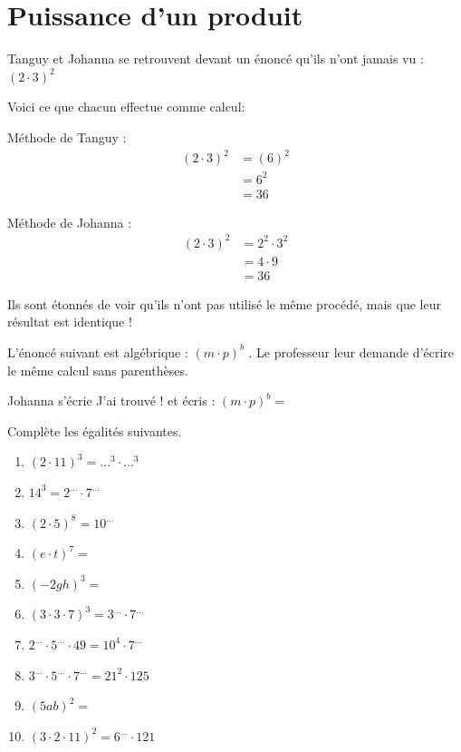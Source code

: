 \documentclass[../math2.tex]{subfiles}
\begin{document}
\section{Puissance d'un produit}
Tanguy et Johanna se retrouvent devant un énoncé qu'ils n'ont jamais vu : $(2\cdot3)^2$

Voici ce que chacun effectue comme calcul:

\parbox{.5\linewidth}{%
	\centering
	Méthode de Tanguy :
	\begin{align*}
		(2\cdot 3)^2
		 & = (6)^2 \\
		 & = 6^2   \\
		 & = 36
	\end{align*}}
\parbox{.5\linewidth}{%
	\centering
	Méthode de Johanna :
	\begin{align*}
		(2\cdot 3)^2
		 & = 2^2\cdot3^2 \\
		 & = 4\cdot 9    \\
		 & = 36
	\end{align*}
}

Ils sont étonnés de voir qu'ils n'ont pas utilisé le même procédé, mais que leur résultat est identique !

L'énoncé suivant est algébrique : $(m\cdot p)^b$ . Le professeur leur demande d'écrire le même calcul sans parenthèses.

Johanna s'écrie \og J'ai trouvé !\fg{} et écris : $(m\cdot p)^b=$\dotfill


\begin{center}
\end{center}


\begin{exercise}
	Complète les égalités suivantes.
	\begin{enumerate} [cols=2]
		\item $(2\cdot11)^3=\dots^3\cdot\dots^3$
		\item $14^3=2^{\dots}\cdot7^{\dots}$
		\item $(2\cdot5)^8=10^{\dots}$
		\item $(e\cdot t)^7=$
		\item $(-2gh)^3=$
		\item $(3\cdot3\cdot7)^3=3^{\dots}\cdot 7^{\dots}$
		\item $2^{\dots} \cdot 5^{\dots}\cdot 49 = 10^4\cdot 7^{\dots}$
		\item $3^{\dots}\cdot5^{\dots}\cdot7^{\dots}=21^2\cdot125$
		\item $(5ab)^2=$
		\item $(3\cdot2\cdot11)^2=6^{\dots}\cdot121$
	\end{enumerate}
\end{exercise}
\end{document}
